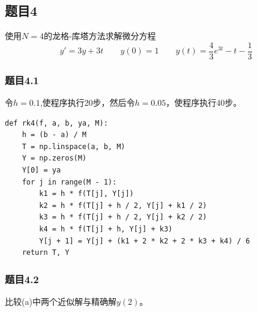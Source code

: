 \subsection{题目4}

使用$N=4$的龙格-库塔方法求解微分方程
$$y'=3y+3t\qquad y(0)=1\qquad y(t)=\frac{4}{3}e^{3t}-t-\frac{1}{3}$$

\subsubsection{题目4.1}

令$h=0.1$,使程序执行20步，然后令$h=0.05$，使程序执行40步。

\begin{verbatim}
def rk4(f, a, b, ya, M):
    h = (b - a) / M
    T = np.linspace(a, b, M)
    Y = np.zeros(M)
    Y[0] = ya
    for j in range(M - 1):
        k1 = h * f(T[j], Y[j])
        k2 = h * f(T[j] + h / 2, Y[j] + k1 / 2)
        k3 = h * f(T[j] + h / 2, Y[j] + k2 / 2)
        k4 = h * f(T[j] + h, Y[j] + k3)
        Y[j + 1] = Y[j] + (k1 + 2 * k2 + 2 * k3 + k4) / 6
    return T, Y
\end{verbatim}

\subsubsection{题目4.2}

比较(a)中两个近似解与精确解$y(2)$。

